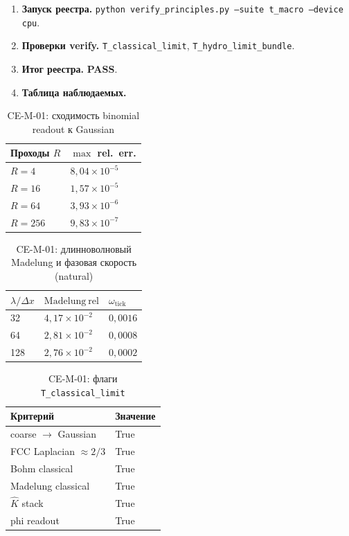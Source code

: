 \label{exp:cem01}
\begin{enumerate}[label=\textbf{Шаг \arabic*:},leftmargin=*,itemsep=0.35em]
\item \textbf{Запуск реестра.} \texttt{python verify\_principles.py --suite t\_macro --device cpu}.
\item \textbf{Проверки verify.} \texttt{T\_classical\_limit}, \texttt{T\_hydro\_limit\_bundle}.
\item \textbf{Итог реестра.} \textbf{PASS}.
\item \textbf{Таблица наблюдаемых.}
\end{enumerate}
\medskip
\begin{table}[htbp]
\centering
\small
\caption{CE-M-01: сходимость binomial readout к Gaussian}
\label{tab:exp-ce-m-01-gauss}
\begin{tabular}{@{}ll@{}}
\toprule
Проходы $R$ & $\max$ rel.\ err. \\
\midrule
$R=4$ & $8{,}04\times 10^{-5}$ \\
$R=16$ & $1{,}57\times 10^{-5}$ \\
$R=64$ & $3{,}93\times 10^{-6}$ \\
$R=256$ & $9{,}83\times 10^{-7}$ \\
\bottomrule
\end{tabular}
\end{table}
\begin{table}[htbp]
\centering
\small
\caption{CE-M-01: длинноволновый Madelung и фазовая скорость (natural)}
\label{tab:exp-ce-m-01-mad}
\begin{tabular}{@{}lll@{}}
\toprule
$\lambda/\Delta x$ & $\mathrm{Madelung\ rel}$ & $\omega_{\mathrm{tick}}$ \\
\midrule
32 & $4{,}17\times 10^{-2}$ & $0{,}0016$ \\
64 & $2{,}81\times 10^{-2}$ & $0{,}0008$ \\
128 & $2{,}76\times 10^{-2}$ & $0{,}0002$ \\
\bottomrule
\end{tabular}
\end{table}
\begin{table}[htbp]
\centering
\small
\caption{CE-M-01: флаги \texttt{T\_classical\_limit}}
\label{tab:exp-ce-m-01-flags}
\begin{tabular}{@{}ll@{}}
\toprule
Критерий & Значение \\
\midrule
coarse $\to$ Gaussian & True \\
FCC Laplacian $\approx 2/3$ & True \\
Bohm classical & True \\
Madelung classical & True \\
$\hat K$ stack & True \\
phi readout & True \\
\bottomrule
\end{tabular}
\end{table}
